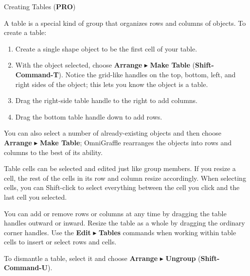 \documentclass[../main.tex]{subfiles}
\begin{document}
\begin{ogsidebar}
  Creating Tables (\textbf{PRO})

  A table is a special kind of group that organizes rows and columns of objects. To create a
  table:

  \begin{enumerate}
    \item Create a single shape object to be the first cell of your table.

    \item With the object selected, choose \textbf{Arrange} $\blacktriangleright$ \textbf{Make
      Table} (\textbf{Shift-Command-T}). Notice the grid-like handles on the top, bottom, left,
      and right sides of the object; this lets you know the object is a table.

    \item Drag the right-side table handle to the right to add columns.

    \item Drag the bottom table handle down to add rows.

  \end{enumerate}

  You can also select a number of already-existing objects and then choose \textbf{Arrange}
  $\blacktriangleright$ \textbf{Make Table}; OmniGraffle rearranges the objects into rows and
  columns to the best of its ability.


  Table cells can be selected and edited just like group members. If you resize a cell, the rest
  of the cells in its row and column resize accordingly. When selecting cells, you can
  Shift-click to select everything between the cell you click and the last cell you selected.

  You can add or remove rows or columns at any time by dragging the table handles outward or
  inward. Resize the table as a whole by dragging the ordinary corner handles. Use the
  \textbf{Edit} $\blacktriangleright$ \textbf{Tables} commands when working within table cells
  to insert or select rows and cells.

  To dismantle a table, select it and choose \textbf{Arrange} $\blacktriangleright$
  \textbf{Ungroup} (\textbf{Shift-Command-U}).
\end{ogsidebar}
\end{document}
